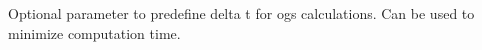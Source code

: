 Optional parameter to predefine delta t for ogs calculations. Can be used to minimize computation time. 